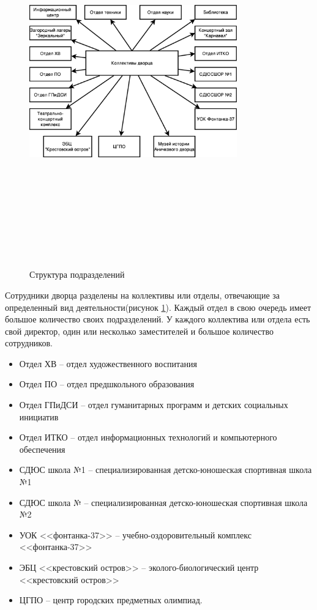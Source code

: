\documentclass[utf8,usehyperref,12pt]{G7-32}
\begin{document}
\begin{figure}[ht]
   \centering%
   \includegraphics[height=160mm, width=0.8\textwidth, clip, keepaspectratio]{pictures/org_struct.eps}
   \caption{Структура подразделений}\label{fig:org_structure}
 \end{figure}

Сотрудники дворца разделены на коллективы или отделы, отвечающие за определенный вид деятельности(рисунок \ref{fig:org_structure}).
Каждый отдел в свою очередь имеет большое количество своих подразделений. У каждого коллектива или отдела есть свой директор, один или несколько заместителей и большое количество сотрудников.


\begin{itemize}
\item Отдел ХВ – отдел художественного воспитания
\item Отдел ПО – отдел предшкольного  образования
\item Отдел ГПиДСИ – отдел гуманитарных программ и детских социальных инициатив
\item Отдел ИТКО – отдел информационных технологий и компьютерного обеспечения
\item СДЮС школа №1 – специализированная детско-юношеская спортивная школа №1
\item СДЮС школа № – специализированная детско-юношеская спортивная школа №2
\item УОК <<фонтанка-37>> – учебно-оздоровительный комплекс <<фонтанка-37>>
\item ЭБЦ <<крестовский остров>> – эколого-биологический центр <<крестовский остров>>
\item ЦГПО – центр городских предметных олимпиад.
\end{itemize}
\end{document}
